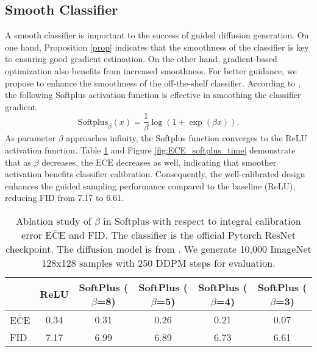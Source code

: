 \documentclass{article}
\theoremstyle{definition}
\begin{document}
\subsection{Smooth Classifier}
A smooth classifier is important to the success of guided diffusion generation. 
On one hand, Proposition \ref{prop} indicates that the smoothness of the classifier is key to ensuring good gradient estimation. 
On the other hand, gradient-based optimization also benefits from increased smoothness.
For better guidance, we propose to enhance the smoothness of the off-the-shelf classifier. 
According to \cite{zhu2021rethinking}, the following Softplus activation function \citep{nair2010rectified} is effective in smoothing the classifier gradient. 
\begin{equation*}
\label{eqn:softplus_eqn}
 \text{Softplus}_{\beta}(x) = \frac{1}{\beta}\log(1+\exp(\beta x)).  
\end{equation*}
As parameter $\beta$ approaches infinity, the Softplus function converges to the ReLU activation function. 
Table \ref{table:ECE_softplus_beta} and Figure \ref{fig:ECE_softplus_time} demonstrate that as $\beta$ decreases, the $\overline{\text{ECE}}$ decreases as well, indicating that smoother activation benefits classifier calibration. Consequently, the well-calibrated design enhances the guided sampling performance compared to the baseline (ReLU), reducing FID from 7.17 to 6.61.
\begin{table}[h!]
\caption{Ablation study of $\beta$ in Softplus with respect to integral calibration error $\overline{\text{ECE}}$ and FID. The classifier is the official Pytorch ResNet checkpoint. The diffusion model is from \cite{dhariwal2021diffusion}. We generate 10,000 ImageNet 128x128 samples with 250 DDPM steps for evaluation.}
\label{table:ECE_softplus_beta}
\begin{center}
\begin{small}
\begin{sc}
\begin{tabular}{lccccc}
\toprule
     & ReLU & SoftPlus ($\beta$=8) & SoftPlus ($\beta$=5) & SoftPlus ($\beta$=4) & SoftPlus ($\beta$=3) \\
\midrule
$\overline{\text{ECE}}$  & 0.34 & 0.31 & 0.26 & 0.21 & 0.07 \\
FID  & 7.17 & 6.99 & 6.89 &  6.73  & 6.61 \\
\bottomrule
\end{tabular}
\end{sc}
\end{small}
\end{center}
\end{table}
\end{document}
